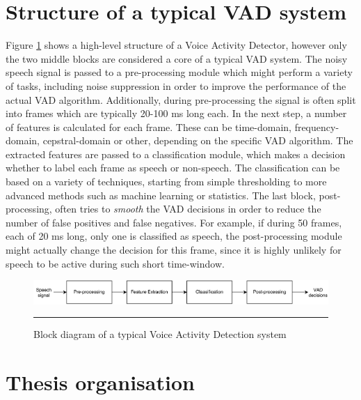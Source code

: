 \section{Structure of a typical VAD system}

Figure \ref{fig:VADStructure} shows a high-level structure of a Voice Activity Detector, however only the two middle blocks are considered a core of a typical VAD system. The noisy speech signal is passed to a pre-processing module which might perform a variety of tasks, including noise suppression in order to improve the performance of the actual VAD algorithm. Additionally, during pre-processing the signal is often split into frames which are typically 20-100 ms long each. In the next step, a number of features is calculated for each frame. These can be time-domain, frequency-domain, cepstral-domain or other, depending on the specific VAD algorithm. The extracted features are passed to a classification module, which makes a decision whether to label each frame as speech or non-speech. The classification can be based on a variety of techniques, starting from simple thresholding to more advanced methods such as machine learning or statistics. The last block, post-processing, often tries to \emph{smooth} the VAD decisions in order to reduce the number of false positives and false negatives. For example, if during 50 frames, each of 20 ms long, only one is classified as speech, the post-processing module might actually change the decision for this frame, since it is highly unlikely for speech to be active during such short time-window.

\begin{figure}[htbp]
	\centering
		\includegraphics[width=1\columnwidth]{Figures/VADStructure.png}
		\rule{37em}{0.5pt}
	\caption[Block diagram of a typical Voice Activity Detection system]{Block diagram of a typical Voice Activity Detection system}
	\label{fig:VADStructure}
\end{figure}


\section{Thesis organisation}